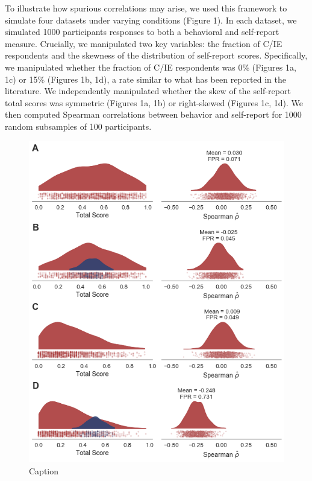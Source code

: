 \documentclass[a4paper,notitlepage,12pt]{article}
\begin{document}
To illustrate how spurious correlations may arise, we used this framework to simulate four datasets under varying conditions (Figure 1). In each dataset, we simulated 1000 participants responses to both a behavioral and self-report measure. Crucially, we manipulated two key variables: the fraction of C/IE respondents and the skewness of the distribution of self-report scores. Specifically, we manipulated whether the fraction of C/IE respondents was 0\% (Figures 1a, 1c) or 15\% (Figures 1b, 1d), a rate similar to what has been reported in the literature. We independently manipulated whether the skew of the self-report total scores was symmetric (Figures 1a, 1b) or right-skewed (Figures 1c, 1d). We then computed Spearman correlations between behavior and self-report for 1000 random subsamples of 100 participants.

\begin{figure}[!b]
    \centering
    \includegraphics[scale=0.6]{figures/figure_01.png}
    \caption{Caption}
    \label{fig:simulations}
\end{figure}
\end{document}
